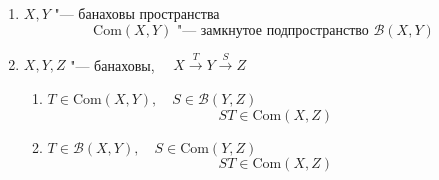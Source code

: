 \begin{theorem}
	\hfill
	\begin{enumerate}
		\item $ X, Y $ "--- банаховы пространства
			$$ \mathrm{Com}(X, Y) \text{ "--- замкнутое подпространство } \mathscr B(X, Y) $$
		\item $ X, Y, Z $ "--- банаховы, $ \quad X \xrightarrow T Y \xrightarrow S Z $
			\begin{enumerate}
				\item $ T \in \mathrm{Com}(X, Y), \quad S \in \mathscr B(Y, Z) $
					$$ ST \in \mathrm{Com}(X, Z) $$
				\item $ T \in \mathscr B(X, Y), \quad S \in \mathrm{Com}(Y, Z) $
					$$ ST \in \mathrm{Com}(X, Z) $$
			\end{enumerate}
	\end{enumerate}
\end{theorem}

